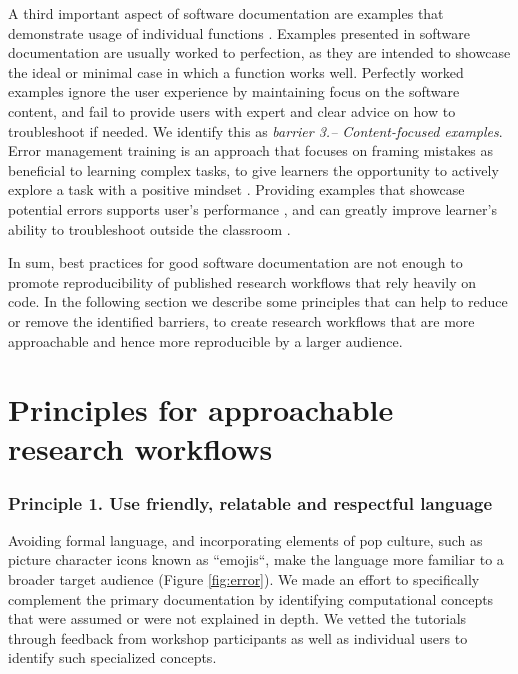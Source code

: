 \documentclass[12pt]{article}
\begin{document}
A third important aspect of software documentation are examples that demonstrate usage of individual functions \citep{karimzadeh2018top}.
Examples presented in software documentation are usually worked to perfection, as they are intended to showcase the ideal or minimal case in which a function works well.
Perfectly worked examples ignore the user experience by maintaining focus on the software content, and fail to provide users with expert and clear advice on how to troubleshoot if needed.
We identify this as \textit{barrier 3.-- Content-focused examples}.
Error management training is an approach that focuses on framing mistakes as beneficial to learning complex tasks, to give learners the opportunity to
actively explore a task with a positive mindset \citep{frese1995error}.
Providing examples that showcase potential errors supports user's performance \citep{steele2014error}, and can greatly improve learner's ability to troubleshoot outside the classroom \citep{shannon2015live, nederbragt2020ten}.


In sum, best practices for good software documentation are not enough to promote reproducibility of published research workflows that rely heavily on code.
In the following section we describe some principles that can help to reduce or remove the identified barriers, to create research workflows that are more approachable and hence more reproducible by a larger audience.

\section*{Principles for approachable research workflows}
\label{sec:addressing}

\subsubsection*{Principle 1. Use friendly, relatable and respectful language}


Avoiding formal language, and incorporating elements of pop culture, such as picture character icons known as ``emojis``, make the language more familiar to a broader target audience (Figure \ref{fig:error}). We made an effort to specifically complement the primary documentation by identifying computational concepts that were assumed or were not explained in depth.
We vetted the tutorials through feedback from workshop participants as well as individual users to identify such specialized concepts.
\end{document}
